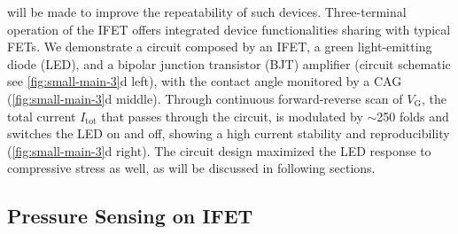 will be made to improve the repeatability of such devices.
Three-terminal operation of the IFET offers integrated
device functionalities sharing with typical FETs. We demonstrate a
circuit composed by an IFET, a green light-emitting diode (LED), and a
bipolar junction transistor (BJT) amplifier (circuit schematic see
\autoref{fig:small-main-3}d left), with the contact angle monitored by
a CAG (\autoref{fig:small-main-3}d middle). Through continuous
forward-reverse scan of \(V_{\mathrm{G}}\), the total current
\(I_{\mathrm{tot}}\) that passes through the circuit, is modulated by
\(\sim\)250 folds and switches the LED on and off, showing a high
current stability and reproducibility (\autoref{fig:small-main-3}d
right). The circuit design maximized the LED response to compressive
stress as well, as will be
discussed in following sections.

\subsection{Pressure Sensing on IFET}
\label{sec:press-sens-ifet}

